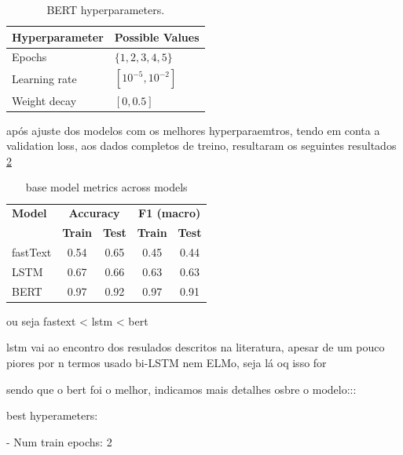 \documentclass[conference]{IEEEtran}
\begin{document}
\begin{table}[H]
\begin{subtable}[t]{0.45\textwidth}
        \label{parameters_baselstm}
    \end{subtable}
    \begin{subtable}[t]{0.45\textwidth}
        \centering
        \begin{tabular}{ll}
        \toprule
        \textbf{Hyperparameter} & \textbf{Possible Values} \\
        \midrule
        Epochs \phantom{abcng disnsin} & $\{1,2,3,4,5\}$ \phantom{onds} \\
        Learning rate & $[10^{-5}, 10^{-2}]$ \\
        Weight decay & $[0, 0.5]$ \\
        \bottomrule
        \end{tabular}
        \vspace{.3em}
        \caption{BERT hyperparameters.}
        \label{parameters_basebert}
    \end{subtable}
\end{table}


após ajuste dos modelos com os melhores hyperparaemtros, tendo em conta a validation loss, aos dados completos de treino, resultaram os seguintes resultados \ref{basemodel_models}

\begin{table}[H]
\centering
\caption{base model metrics across models}
\label{basemodel_models}
\begin{tabular}{lcccc}
\toprule
\textbf{Model} & \multicolumn{2}{c}{\textbf{Accuracy}} & \multicolumn{2}{c}{\textbf{F1 (macro)}} \\
\cmidrule(lr){2-3} \cmidrule(lr){4-5}
 & \textbf{Train} & \textbf{Test} & \textbf{Train} & \textbf{Test} \\
\midrule
fastText & 0.54 & 0.65 & 0.45 & 0.44 \\
LSTM & 0.67 & 0.66 & 0.63 & 0.63 \\
BERT & 0.97 & 0.92 & 0.97 & 0.91 \\
\bottomrule
\end{tabular}
\end{table}

ou seja fastext < lstm < bert

lstm vai ao encontro dos resulados descritos na literatura, apesar de um pouco piores por n termos usado bi-LSTM nem ELMo, seja lá oq isso for

sendo que o bert foi o melhor, indicamos mais detalhes osbre o modelo:::

best hyperameters: 

- Num train epochs: 2
\end{document}
